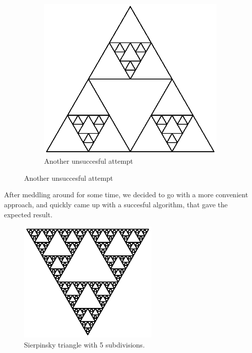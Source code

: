\documentclass[titlepage]{article}
\begin{document}
\begin{figure}[H]
\begin{subfigure}[b]{0.5\textwidth}
    \includegraphics[width=\textwidth]{wrongtriangle2}
    \caption{Another unsuccesful attempt}
  \end{subfigure}
\end{figure}
After meddling around for some time, we decided to go with a more convenient approach, and quickly came up with a succesful algorithm, that gave the expected result.
\begin{figure}[H]
  \includegraphics[width=0.6\textwidth]{triangle}
  \caption{Sierpinsky triangle with 5 subdivisions.}
\end{figure}
\end{document}
